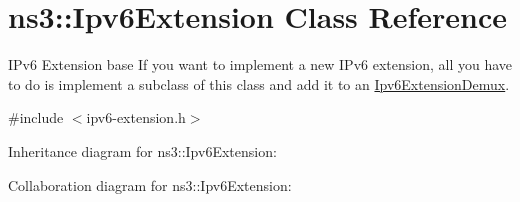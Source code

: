 \hypertarget{classns3_1_1Ipv6Extension}{}\section{ns3\+:\+:Ipv6\+Extension Class Reference}
\label{classns3_1_1Ipv6Extension}


I\+Pv6 Extension base If you want to implement a new I\+Pv6 extension, all you have to do is implement a subclass of this class and add it to an \hyperlink{classns3_1_1Ipv6ExtensionDemux}{Ipv6\+Extension\+Demux}.  




{\ttfamily \#include $<$ipv6-\/extension.\+h$>$}



Inheritance diagram for ns3\+:\+:Ipv6\+Extension\+:


Collaboration diagram for ns3\+:\+:Ipv6\+Extension\+:
